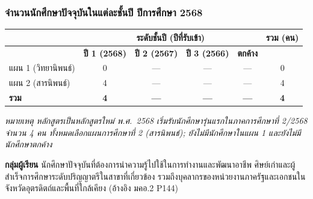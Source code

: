 \vspace{6pt}
\subsubsection*{จำนวนนักศึกษาปัจจุบันในแต่ละชั้นปี ปีการศึกษา 2568}

\begingroup
\footnotesize
\setlength{\tabcolsep}{4pt}
\renewcommand{\arraystretch}{1.3}
\begin{tabularx}{\linewidth}{|>{\raggedright\arraybackslash}X|c|c|c|c|c|}
  \hline
  \rowcolor{gray!15}
  \multirow{2}{*}{\textbf{แผนการศึกษา}} & \multicolumn{4}{c|}{\textbf{ระดับชั้นปี (ปีที่รับเข้า)}} & \multirow{2}{*}{\textbf{รวม (คน)}} \\
  \cline{2-5}
  & \textbf{ปี 1 (2568)} & \textbf{ปี 2 (2567)} & \textbf{ปี 3 (2566)} & \textbf{ตกค้าง} & \\
  \hline
  แผน 1 (วิทยานิพนธ์) & 0 & --- & --- & --- & 0 \\
  \hline
  แผน 2 (สารนิพนธ์) & 4 & --- & --- & --- & 4 \\
  \hline
  \textbf{รวม} & \textbf{4} & \textbf{---} & \textbf{---} & \textbf{---} & \textbf{4} \\
  \hline
\end{tabularx}
\endgroup

\vspace{4pt}
\footnotesize \textit{หมายเหตุ หลักสูตรเป็นหลักสูตรใหม่ พ.ศ.~2568 เริ่มรับนักศึกษารุ่นแรกในภาคการศึกษาที่ 2/2568 จำนวน 4 คน ทั้งหมดเลือกแผนการศึกษาที่ 2 (สารนิพนธ์); ยังไม่มีนักศึกษาในแผน 1 และยังไม่มีนักศึกษาตกค้าง}

\vspace{6pt}
\textbf{กลุ่มผู้เรียน} นักศึกษาปัจจุบันที่ต้องการนำความรู้ไปใช้ในการทำงานและพัฒนาอาชีพ ศิษย์เก่าและผู้สำเร็จการศึกษาระดับปริญญาตรีในสาขาที่เกี่ยวข้อง รวมถึงบุคลากรของหน่วยงานภาครัฐและเอกชนในจังหวัดอุตรดิตถ์และพื้นที่ใกล้เคียง (อ้างอิง มคอ.2 P144)
